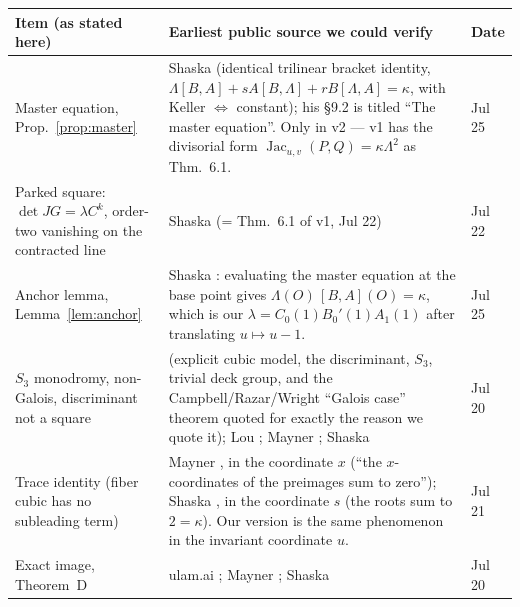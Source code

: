 \documentclass[11pt]{amsart}
\theoremstyle{plain}
\theoremstyle{definition}
\theoremstyle{remark}
\begin{document}
\begin{center}
\small
\begin{tabular}{p{}p{}l}
\toprule
Item (as stated here) & Earliest public source we could verify & Date\\
\midrule
Master equation, Prop.~\ref{prop:master}
 & Shaska \cite[Thm.~8.3]{Shaska26} (identical trilinear bracket
   identity, $\Lambda[B,A]+sA[B,\Lambda]+rB[\Lambda,A]=\kappa$, with
   Keller $\iff$ constant); his \S9.2 is titled ``The master equation''.
   Only in v2 --- v1 has the divisorial form
   $\operatorname{Jac}_{u,v}(P,Q)=\kappa\Lambda^{2}$ as Thm.~6.1.
 & Jul 25\\
Parked square: $\det JG=\lambda C^{k}$, order-two vanishing on the
contracted line
 & Shaska \cite[Thm.~7.1]{Shaska26} (= Thm.~6.1 of v1, Jul 22)
 & Jul 22\\
Anchor lemma, Lemma~\ref{lem:anchor}
 & Shaska \cite[Lem.~8.5]{Shaska26}: evaluating the master equation at the
   base point gives $\Lambda(O)\,[B,A](O)=\kappa$, which is our
   $\lambda=C_{0}(1)B_{0}'(1)A_{1}(1)$ after translating $u\mapsto u-1$.
 & Jul 25\\
$S_{3}$ monodromy, non-Galois, discriminant not a square
 & \cite{MO513387} (explicit cubic model, the discriminant, $S_{3}$,
   trivial deck group, and the Campbell/Razar/Wright ``Galois case''
   theorem quoted for
   exactly the reason we quote it); Lou \cite{Lou26}; Mayner
   \cite[\S4.4]{Mayner26}; Shaska \cite[Thm.~4.4(2)]{Shaska26}
 & Jul 20\\
Trace identity (fiber cubic has no subleading term)
 & Mayner \cite[\S4.2]{Mayner26}, in the coordinate $x$ (``the
   $x$-coordinates of the preimages sum to zero''); Shaska
   \cite[Rem.~5.4]{Shaska26}, in the coordinate $s$ (the roots sum to
   $2=\kappa$). Our version is the same phenomenon in the invariant
   coordinate $u$.
 & Jul 21\\
Exact image, Theorem~D
 & ulam.ai \cite[Thm.~4.2]{Ulam26}; Mayner \cite[\S4.3]{Mayner26};
   Shaska \cite[Prop.~5.1]{Shaska26}
 & Jul 20\\
\bottomrule
\end{tabular}
\end{center}
\end{document}
